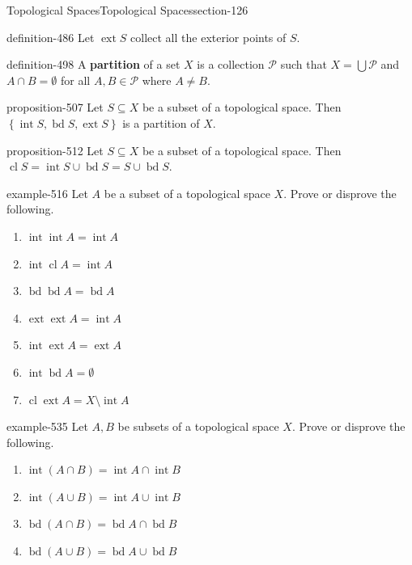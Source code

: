 \documentclass[oneside,10pt,]{article}
\newcommand{\terminology}[1]{\textbf{#1}}
\newcommand{\mc}{\mathcal}
\newcommand{\cl}{\operatorname{cl}}
\renewcommand{\int}{\operatorname{int}}
\newcommand{\ext}{\operatorname{ext}}
\newcommand{\bd}{\operatorname{bd}}
\newcommand{\setList}[1]{\left\{#1\right\}}
\begin{document}
\begin{sectionptx}{Topological Spaces}{}{Topological Spaces}{}{}{section-126}
\begin{definition}{}{definition-486}
Let \(\ext S\) collect all the exterior points of \(S\).%
\end{definition}
\begin{definition}{}{definition-498}%
\hypertarget{p-499}{}%
A \terminology{partition} of a set \(X\) is a collection \(\mc P\) such that \(X=\bigcup\mc P\) and \(A\cap B=\emptyset\) for all \(A,B\in\mc P\) where \(A\not=B\).%
\end{definition}
\begin{proposition}{}{}{proposition-507}%
\hypertarget{p-508}{}%
Let \(S\subseteq X\) be a subset of a topological space. Then \(\setList{\int S,\bd S,\ext S}\) is a partition of \(X\).%
\end{proposition}
\begin{proposition}{}{}{proposition-512}%
\hypertarget{p-513}{}%
Let \(S\subseteq X\) be a subset of a topological space. Then \(\cl S=\int S\cup\bd S=S\cup\bd S\).%
\end{proposition}
\begin{example}{}{example-516}%
\hypertarget{p-517}{}%
Let \(A\) be a subset of a topological space \(X\). Prove or disprove the following.%
\leavevmode%
\begin{enumerate}
\item\hypertarget{li-521}{}\(\int\int A=\int A\)%
\item\hypertarget{li-523}{}\(\int\cl A=\int A\)%
\item\hypertarget{li-525}{}\(\bd\bd A=\bd A\)%
\item\hypertarget{li-527}{}\(\ext\ext A=\int A\)%
\item\hypertarget{li-529}{}\(\int\ext A=\ext A\)%
\item\hypertarget{li-531}{}\(\int\bd A=\emptyset\)%
\item\hypertarget{li-533}{}\(\cl\ext A=X\setminus\int A\)%
\end{enumerate}
\end{example}
\begin{example}{}{example-535}%
\hypertarget{p-536}{}%
Let \(A,B\) be subsets of a topological space \(X\). Prove or disprove the following.%
\leavevmode%
\begin{enumerate}
\item\hypertarget{li-540}{}\(\int(A\cap B)=\int A\cap\int B\)%
\item\hypertarget{li-542}{}\(\int(A\cup B)=\int A\cup\int B\)%
\item\hypertarget{li-544}{}\(\bd(A\cap B)=\bd A\cap\bd B\)%
\item\hypertarget{li-546}{}\(\bd(A\cup B)=\bd A\cup\bd B\)%

\end{enumerate}
\end{example}
\end{sectionptx}
\end{document}
